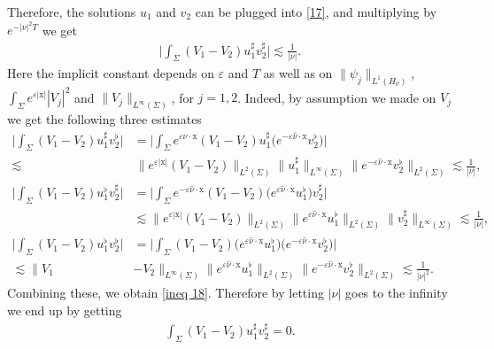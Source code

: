 \documentclass[10pt,a4paper]{amsart}
\newcommand{\x}{\mathrm{x}}
\newcommand{\marnote}[1]{\marginpar{\footnotesize #1}} %
\begin{document}
Therefore, the solutions $u_1$ and $v_2$ can be plugged into \eqref{17}, 
and multiplying by $e^{-|\nu|^2 T}$
 we get 
%
\begin{align}\label{ineq 18}
   \Big| \int_\Sigma   (V_1 - V_2) u_1^\sharp {v_2^\sharp}  \Big|  \lesssim \frac{1}{|\nu|}.
\end{align}
 Here the implicit constant depends on 
$\varepsilon$ and $T$ as well as on $\| \psi_j \|_{L^1(H_{\hat \nu})}$,
$\int_\Sigma e^{ \varepsilon |\x|} |V_j|^2$ and $ \| V_j  \|_{L^\infty(\Sigma)}  $, for $j=1,2$. Indeed, by assumption we made on $V_j$ we get the following three estimates 
\begin{align*}
   \Big| \int_\Sigma   (V_1 - V_2) u_1^\sharp {v_2^\flat} \Big| & =  \Big| \int_\Sigma   e^{\varepsilon \hat{\nu} \cdot \x}(V_1 - V_2) u_1^\sharp \big(e^{- \varepsilon \hat{\nu} \cdot \x}v_2^\flat \big) \Big|  \\
   \lesssim & \, \| e^{\varepsilon | \x|}(V_1 - V_2)  \|_{L^2(\Sigma)} 
   \| u_1^\sharp  \|_{L^\infty(\Sigma)} 
   \| e^{- \varepsilon \hat{\nu} \cdot \x}v_2^\flat   \|_{L^2(\Sigma)} \lesssim \frac{1}{|\nu|}, \\
      \Big| \int_\Sigma   (V_1 - V_2) u_1^\flat {v_2^\sharp}  \Big| &=   \Big| \int_\Sigma   e^{-\varepsilon \hat{\nu} \cdot \x}(V_1 - V_2) \big(e^{\varepsilon \hat{\nu} \cdot \x} u_1^\flat \big) v_2^\sharp  \Big|  \\
   &\lesssim \| e^{\varepsilon | \x|}(V_1 - V_2)  \|_{L^2(\Sigma)}  
   \| e^{\varepsilon \hat{\nu} \cdot \x}u_1^\flat   \|_{L^2(\Sigma)}
    \| v_2^\sharp  \|_{L^\infty(\Sigma)} \lesssim \frac{1}{|\nu|},\\
         \Big| \int_\Sigma   (V_1 - V_2) u_1^\flat {v_2^\flat}  \Big| &=   \Big| \int_\Sigma (V_1 - V_2) \big(e^{\varepsilon \hat{\nu} \cdot \x} u_1^\flat \big)\big(e^{- \varepsilon \hat{\nu} \cdot \x}v_2^\flat \big) \Big|  \\
   \lesssim  \| V_1 &- V_2  \|_{L^\infty(\Sigma)}  
   \| e^{\varepsilon \hat{\nu} \cdot \x}u_1^\flat   \|_{L^2(\Sigma)}
    \| e^{- \varepsilon \hat{\nu} \cdot \x}v_2^\flat \|_{L^2(\Sigma)}\lesssim \frac{1}{|\nu|^2}.
\end{align*}
Combining these, we obtain \eqref{ineq 18}. Therefore by letting $|\nu|$ goes to the infinity we end up by getting
\begin{align}
    \int_\Sigma  (V_1 - V_2) u_1^\sharp {v_2^\sharp}=0.
\end{align}
\end{document}

